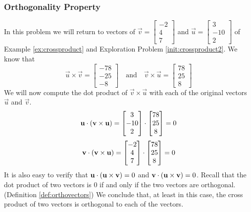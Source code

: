 \documentclass{ximera}
\begin{document}
\subsubsection*{Orthogonality Property}
\begin{exploration}\label{init:orthofcorssproduct}
In this problem we will return to vectors of $\vec{v}=\begin{bmatrix}-2\\ 4\\ 7\end{bmatrix}$ and $\vec{u}=\begin{bmatrix}3\\ -10\\ 2\end{bmatrix}$ of Example \ref{ex:crossproduct} and Exploration Problem \ref{init:crossproduct2}.  We know that 
$$\vec{u}\times\vec{v}=\begin{bmatrix}-78\\-25\\-8\end{bmatrix}\quad\text{and}\quad\vec{v}\times\vec{u}=\begin{bmatrix}78\\25\\8\end{bmatrix}$$
We will now compute the dot product of $\vec{v}\times\vec{u}$ with each of the original vectors $\vec{u}$ and $\vec{v}$.
$$\mathbf{u}\cdot(\mathbf{v}\times\mathbf{u})=\begin{bmatrix}3\\ -10\\ 2\end{bmatrix}\cdot\begin{bmatrix}78\\25\\8\end{bmatrix}=0$$
$$\mathbf{v}\cdot(\mathbf{v}\times\mathbf{u})=\begin{bmatrix}-2\\ 4\\ 7\end{bmatrix}\cdot\begin{bmatrix}78\\25\\8\end{bmatrix}=0$$
It is also easy to verify that $\mathbf{u}\cdot(\mathbf{u}\times\mathbf{v})=0$ and $\mathbf{v}\cdot(\mathbf{u}\times\mathbf{v})=0$.  Recall that the dot product of two vectors is $0$ if and only if the two vectors are orthogonal. (Definition \ref{def:orthovectors})
We conclude that, at least in this case, the cross product of two vectors is orthogonal to each of the vectors.  

\end{exploration}
\end{document}
